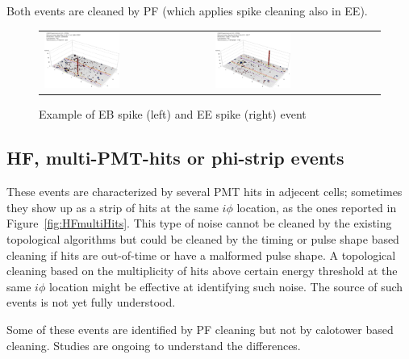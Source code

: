 Both events are cleaned by PF (which applies spike cleaning also in EE).
%
\begin{figure}[h]
 \centering
 \begin{tabular}{ll}
   \includegraphics[width=0.47\textwidth]{fig/EBspike.eps} &
   \includegraphics[width=0.47\textwidth]{fig/EEspike.eps} \\
 \end{tabular}
\caption{Example of EB spike (left) and EE spike (right) event}
\label{fig:EBEEspike}
\end{figure}


\subsection{HF, multi-PMT-hits or phi-strip events}
These events are characterized by several PMT hits in adjecent cells; sometimes they show up as
a strip of hits at the same $i\phi$ location, as the ones reported in Figure~\ref{fig:HFmultiHits}. 
This type of noise cannot be cleaned by the existing topological algorithms but could 
be cleaned by the timing or pulse shape based 
cleaning if hits are out-of-time or have a malformed pulse shape. 
A topological cleaning based on the multiplicity of hits above certain energy threshold 
at the same $i\phi$ location might be effective at identifying such noise.
The source of such events is not yet fully understood.

Some of these events are identified by PF cleaning but not by calotower based cleaning.
Studies are ongoing to understand the differences.

